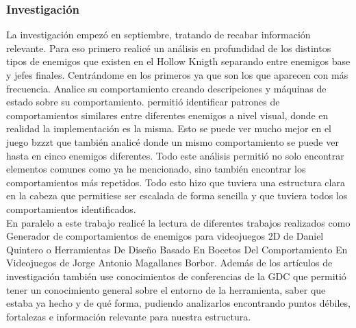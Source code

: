 \subsubsection*{Investigación}
La investigación empezó en septiembre, tratando de recabar información relevante. Para eso primero realicé un análisis en profundidad de los distintos tipos de enemigos que existen en el Hollow Knigth separando entre enemigos base y jefes finales. Centrándome en los primeros ya que son los que aparecen con más frecuencia. Analice su comportamiento creando descripciones y máquinas de estado sobre su comportamiento.   permitió identificar patrones de comportamientos similares entre diferentes enemigos a nivel visual, donde en realidad la implementación es la misma. Esto se puede ver mucho mejor en el juego bzzzt que también analicé donde un mismo comportamiento se puede ver hasta en cinco enemigos diferentes. Todo este análisis permitió no solo encontrar elementos comunes como ya he mencionado, sino también encontrar los comportamientos más repetidos.
Todo esto hizo que tuviera una estructura clara en la cabeza que permitiese ser escalada de forma sencilla y que tuviera todos los comportamientos identificados.\\
En paralelo a este trabajo realicé la lectura de diferentes trabajos realizados como Generador de comportamientos de enemigos para videojuegos 2D de Daniel Quintero o Herramientas De Diseño Basado En Bocetos Del Comportamiento En Videojuegos de Jorge Antonio Magallanes Borbor. Además de los artículos de investigación también use conocimientos de conferencias de la GDC que permitió tener un conocimiento general sobre el  entorno de la herramienta, saber que estaba ya hecho y de qué forma, pudiendo analizarlos encontrando puntos débiles, fortalezas e información relevante para nuestra estructura.

